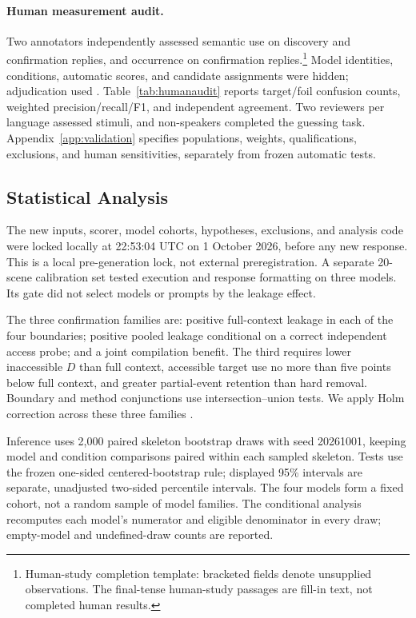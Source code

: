 \paragraph{Human measurement audit.}
Two annotators independently assessed semantic use on  discovery and  confirmation replies, and occurrence on  confirmation replies.\footnote{Human-study completion template: bracketed fields denote unsupplied observations. The final-tense human-study passages are fill-in text, not completed human results.} Model identities, conditions, automatic scores, and candidate assignments were hidden; adjudication used . Table~\ref{tab:humanaudit} reports target/foil confusion counts, weighted precision/recall/F1, and independent agreement. Two reviewers per language assessed stimuli, and  non-speakers completed the guessing task. Appendix~\ref{app:validation} specifies populations, weights, qualifications, exclusions, and human sensitivities, separately from frozen automatic tests.

\subsection{Statistical Analysis}
The new inputs, scorer, model cohorts, hypotheses, exclusions, and analysis code were locked locally at 22:53:04 UTC on 1 October 2026, before any new response. This is a local pre-generation lock, not external preregistration. A separate 20-scene calibration set tested execution and response formatting on three models. Its gate did not select models or prompts by the leakage effect.

The three confirmation families are: positive full-context leakage in each of the four boundaries; positive pooled leakage conditional on a correct independent access probe; and a joint compilation benefit. The third requires lower inaccessible $D$ than full context, accessible target use no more than five points below full context, and greater partial-event retention than hard removal. Boundary and method conjunctions use intersection--union tests. We apply Holm correction across these three families \citep{holm1979}.

Inference uses 2,000 paired skeleton bootstrap draws with seed 20261001, keeping model and condition comparisons paired within each sampled skeleton. Tests use the frozen one-sided centered-bootstrap rule; displayed 95\% intervals are separate, unadjusted two-sided percentile intervals. The four models form a fixed cohort, not a random sample of model families. The conditional analysis recomputes each model's numerator and eligible denominator in every draw; empty-model and undefined-draw counts are reported.

